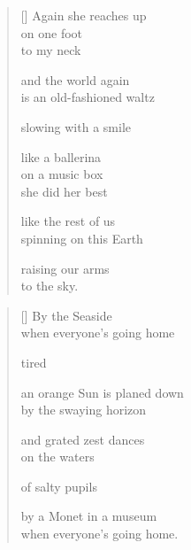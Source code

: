 \documentclass[14pt]{extbook}
\newcommand*{\centeredornament}{\centerline{\pgfornament[width=6cm]{88}}}
\begin{document}

\newpage

\vspace*{-15mm}
\centeredornament
\vspace*{-7mm}


\settowidth{\versewidth}{is an old-fashioned waltz}

\begin{verse}[\versewidth]
  Again she reaches up \\
  on one foot \\
  to my neck

  and the world again \\
  is an old-fashioned waltz

  slowing with a smile

  like a ballerina \\
  on a music box \\
  she did her best

  like the rest of us \\
  spinning on this Earth

  raising our arms \\
  to the sky.
\end{verse}


\newpage

\vspace*{-15mm}
\centeredornament
\vspace*{-7mm}


\settowidth{\versewidth}{an orange Sun is planed down}

\begin{verse}[\versewidth]
  By the Seaside \\
  when everyone's going home

  tired

  an orange Sun is planed down \\
  by the swaying horizon

  and grated zest dances \\
  on the waters

  of salty pupils

  by a Monet in a museum \\
  when everyone's going home.
\end{verse}
\end{document}
